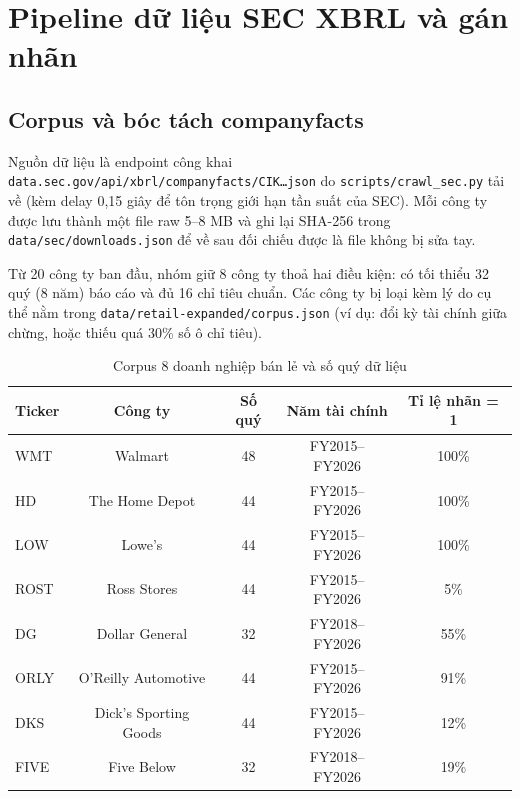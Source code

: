 \documentclass[13pt,a4paper]{extreport}
\begin{document}
\section{Pipeline dữ liệu SEC XBRL và gán nhãn}

\subsection{Corpus và bóc tách companyfacts}

Nguồn dữ liệu là endpoint công khai \texttt{data.sec.gov/api/xbrl/companyfacts/CIK…json} do \texttt{scripts/crawl\_sec.py} tải về (kèm delay 0,15 giây để tôn trọng giới hạn tần suất của SEC). Mỗi công ty được lưu thành một file raw 5–8 MB và ghi lại SHA-256 trong \texttt{data/sec/downloads.json} để về sau đối chiếu được là file không bị sửa tay.

Từ 20 công ty ban đầu, nhóm giữ 8 công ty thoả hai điều kiện: có tối thiểu 32 quý (8 năm) báo cáo và đủ 16 chỉ tiêu chuẩn. Các công ty bị loại kèm lý do cụ thể nằm trong \texttt{data/retail-expanded/corpus.json} (ví dụ: đổi kỳ tài chính giữa chừng, hoặc thiếu quá 30\% số ô chỉ tiêu).

\begin{table}[H]
\centering
\caption{Corpus 8 doanh nghiệp bán lẻ và số quý dữ liệu}
\begin{center}
\footnotesize
\begin{tabular}{|l|c|c|c|c|}
\hline
\textbf{Ticker} & \textbf{Công ty} & \textbf{Số quý} & \textbf{Năm tài chính} & \textbf{Tỉ lệ nhãn = 1} \\ \hline
WMT & Walmart & 48 & FY2015–FY2026 & 100\% \\ \hline
HD & The Home Depot & 44 & FY2015–FY2026 & 100\% \\ \hline
LOW & Lowe's & 44 & FY2015–FY2026 & 100\% \\ \hline
ROST & Ross Stores & 44 & FY2015–FY2026 & 5\% \\ \hline
DG & Dollar General & 32 & FY2018–FY2026 & 55\% \\ \hline
ORLY & O'Reilly Automotive & 44 & FY2015–FY2026 & 91\% \\ \hline
DKS & Dick's Sporting Goods & 44 & FY2015–FY2026 & 12\% \\ \hline
FIVE & Five Below & 32 & FY2018–FY2026 & 19\% \\ \hline
\end{tabular}
\end{center}
\end{table}
\end{document}
